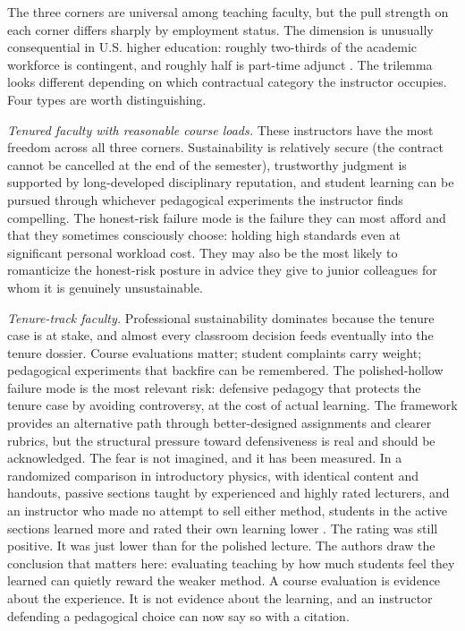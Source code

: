 \documentclass{SIAMbook2023}
\begin{document}
The three corners are universal among teaching faculty, but the pull strength on each corner differs sharply by employment status. The dimension is unusually consequential in U.S. higher education: roughly two-thirds of the academic workforce is contingent, and roughly half is part-time adjunct \citep{aaup2025contingent}. The trilemma looks different depending on which contractual category the instructor occupies. Four types are worth distinguishing.

\textit{Tenured faculty with reasonable course loads.} These instructors have the most freedom across all three corners. Sustainability is relatively secure (the contract cannot be cancelled at the end of the semester), trustworthy judgment is supported by long-developed disciplinary reputation, and student learning can be pursued through whichever pedagogical experiments the instructor finds compelling. The honest-risk failure mode is the failure they can most afford and that they sometimes consciously choose: holding high standards even at significant personal workload cost. They may also be the most likely to romanticize the honest-risk posture in advice they give to junior colleagues for whom it is genuinely unsustainable.

\textit{Tenure-track faculty.} Professional sustainability dominates because the tenure case is at stake, and almost every classroom decision feeds eventually into the tenure dossier. Course evaluations matter; student complaints carry weight; pedagogical experiments that backfire can be remembered. The polished-hollow failure mode is the most relevant risk: defensive pedagogy that protects the tenure case by avoiding controversy, at the cost of actual learning. The framework provides an alternative path through better-designed assignments and clearer rubrics, but the structural pressure toward defensiveness is real and should be acknowledged. The fear is not imagined, and it has been measured. In a randomized comparison in introductory physics, with identical content and handouts, passive sections taught by experienced and highly rated lecturers, and an instructor who made no attempt to sell either method, students in the active sections learned more and rated their own learning lower \citep{deslauriers2019measuring}. The rating was still positive. It was just lower than for the polished lecture. The authors draw the conclusion that matters here: evaluating teaching by how much students feel they learned can quietly reward the weaker method. A course evaluation is evidence about the experience. It is not evidence about the learning, and an instructor defending a pedagogical choice can now say so with a citation.
\end{document}
